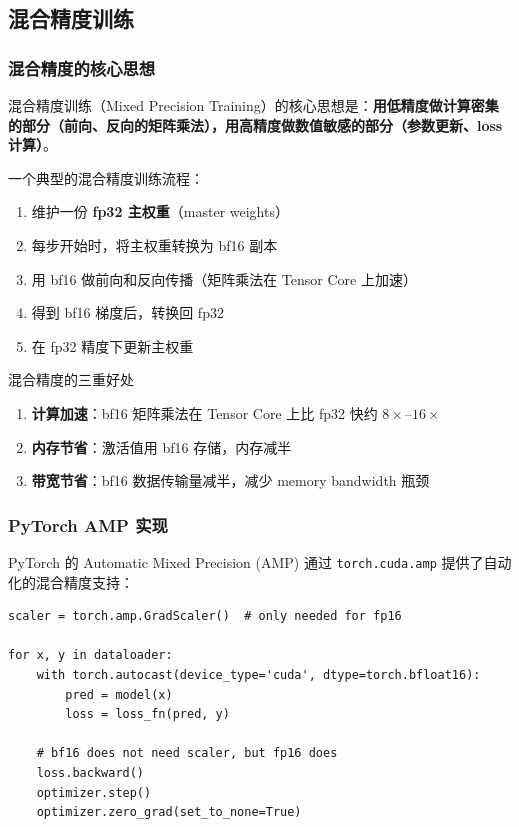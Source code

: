 \documentclass[a4paper]{article}
\begin{document}
\subsection{混合精度训练}

\subsubsection{混合精度的核心思想}

混合精度训练（Mixed Precision Training）的核心思想是：\textbf{用低精度做计算密集的部分（前向、反向的矩阵乘法），用高精度做数值敏感的部分（参数更新、loss 计算）}。

一个典型的混合精度训练流程：
\begin{enumerate}
    \item 维护一份 \textbf{fp32 主权重}（master weights）
    \item 每步开始时，将主权重转换为 bf16 副本
    \item 用 bf16 做前向和反向传播（矩阵乘法在 Tensor Core 上加速）
    \item 得到 bf16 梯度后，转换回 fp32
    \item 在 fp32 精度下更新主权重
\end{enumerate}

\begin{importantbox}{混合精度的三重好处}
\begin{enumerate}
    \item \textbf{计算加速}：bf16 矩阵乘法在 Tensor Core 上比 fp32 快约 $8\times$--$16\times$
    \item \textbf{内存节省}：激活值用 bf16 存储，内存减半
    \item \textbf{带宽节省}：bf16 数据传输量减半，减少 memory bandwidth 瓶颈
\end{enumerate}
\end{importantbox}

\subsubsection{PyTorch AMP 实现}

PyTorch 的 Automatic Mixed Precision (AMP) 通过 \texttt{torch.cuda.amp} 提供了自动化的混合精度支持：

\begin{lstlisting}[caption={使用 PyTorch AMP 的训练循环}]
scaler = torch.amp.GradScaler()  # only needed for fp16

for x, y in dataloader:
    with torch.autocast(device_type='cuda', dtype=torch.bfloat16):
        pred = model(x)
        loss = loss_fn(pred, y)

    # bf16 does not need scaler, but fp16 does
    loss.backward()
    optimizer.step()
    optimizer.zero_grad(set_to_none=True)
\end{lstlisting}
\end{document}
